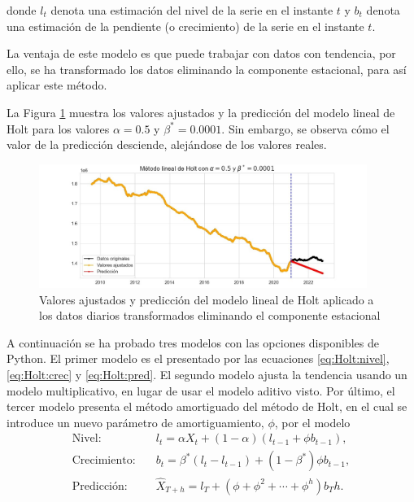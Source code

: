 \documentclass[12pt,twoside]{article}
\begin{document}
donde $l_t$ denota una estimación del nivel de la serie en el instante $t$ y $b_t$ denota una estimación de la pendiente (o crecimiento) de la serie en el instante $t$.


La ventaja de este modelo es que puede trabajar con datos con tendencia, por ello, se ha transformado los datos eliminando la componente estacional, para así aplicar este método.

La Figura \ref{fig:Holt1} muestra los valores ajustados y la predicción del modelo lineal de Holt para los valores $\alpha=0.5$ y $\beta^* = 0.0001$. Sin embargo, se observa cómo el valor de la predicción desciende, alejándose de los valores reales.

\begin{figure}[h]
    \centering
    \includegraphics[width = 0.95\textwidth]{imagenes/Holt1.jpg}
    \caption{Valores ajustados y predicción del modelo lineal de Holt aplicado a los datos diarios transformados eliminando el componente estacional}\label{fig:Holt1}
\end{figure}

A continuación se ha probado tres modelos con las opciones disponibles de Python. El primer modelo es el presentado por las ecuaciones \eqref{eq:Holt:nivel}, \eqref{eq:Holt:crec} y \eqref{eq:Holt:pred}. El segundo modelo ajusta la tendencia usando un modelo multiplicativo, en lugar de usar el modelo aditivo visto. Por último, el tercer modelo presenta el método amortiguado del método de Holt, en el cual se introduce un nuevo parámetro de amortiguamiento, $\phi$, por el modelo 
\begin{align*}
    \text{Nivel:} \quad& l_t = \alpha X_t + (1-\alpha)(l_{t-1} + \phi b_{t-1}),\\
    \text{Crecimiento:} \quad& b_t = \beta^*(l_t - l_{t-1}) + (1-\beta^*)\phi b_{t-1},\\
    \text{Predicción:} \quad& \hat{X}_{T+h} = l_T + (\phi + \phi^2 + \dotsb + \phi^h)b_Th.
\end{align*}
\end{document}

